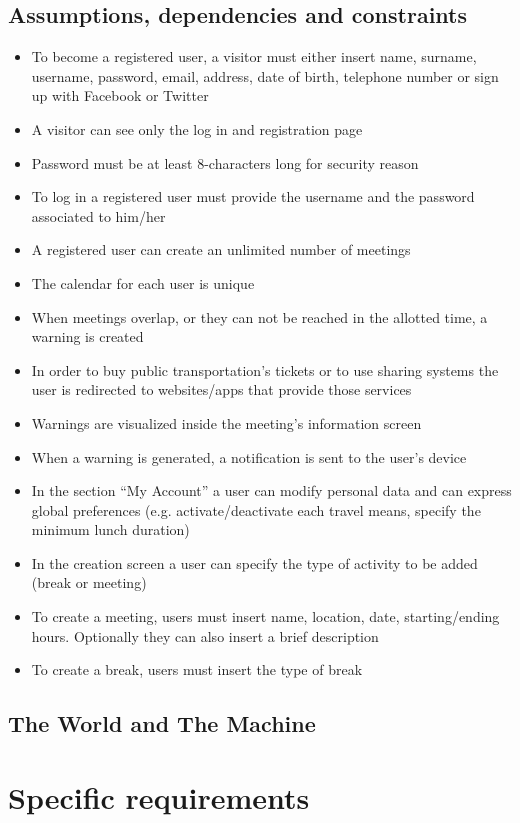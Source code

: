 \documentclass[12pt,titlepage]{article}
\begin{document}
\subsection{Assumptions, dependencies and constraints}\label{sec:mod1}
\begin{itemize}
\item To become a registered user, a visitor must either insert name, surname, username, password, email, address, date of birth, telephone number or sign up with Facebook or Twitter
\item A visitor can see only the log in and registration page
\item Password must be at least 8-characters long for security reason
\item To log in a registered user must provide the username and the password associated to him/her
\item A registered user can create an unlimited number of meetings
\item The calendar for each user is unique
\item When meetings overlap, or they can not be reached in the allotted time, a warning is created
\item In order to buy public transportation's tickets or to use sharing systems the user is redirected to websites/apps that provide those services
\item Warnings are visualized inside the meeting's information screen
\item When a warning is generated, a notification is sent to the user's device 
\item In the section ``My Account'' a user can modify personal data and can express global preferences (e.g. activate/deactivate each travel means, specify the minimum lunch duration)
\item In the creation screen a user can specify the type of activity to be added (break or meeting)
\item To create a meeting, users must insert name, location, date, starting/ending hours. Optionally they can also insert a brief description 
\item To create a break, users must insert the type of break
\end{itemize}

\subsection{The World and The Machine}
\pagebreak
\section{Specific requirements}\label{sec:crit}
\end{document}
